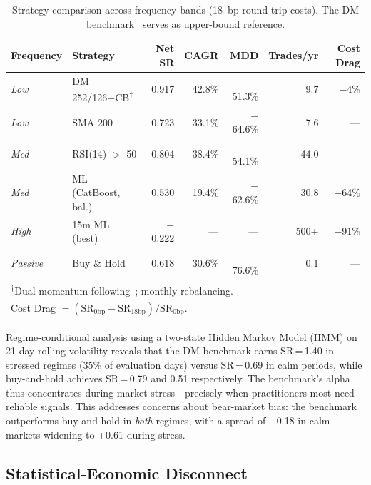 \documentclass[sigconf,anonymous,review]{acmart}
\begin{document}
\begin{table}[t]
\centering
\caption{Strategy comparison across frequency bands (18~bp round-trip
costs). The DM benchmark~\cite{antonacci2014dual} serves as
upper-bound reference.}
\label{tab:cost-baseline}
\small
\begin{tabular}{llrrrrr}
\toprule
Frequency & Strategy & Net SR & CAGR & MDD & Trades/yr & Cost Drag \\
\midrule
\textit{Low} & DM 252/126+CB\textsuperscript{$\dagger$} & 0.917 & 42.8\% & $-$51.3\% & 9.7 & $-$4\% \\
\textit{Low} & SMA 200 & 0.723 & 33.1\% & $-$64.6\% & 7.6 & --- \\
\textit{Med} & RSI(14) $>$ 50 & 0.804 & 38.4\% & $-$54.1\% & 44.0 & --- \\
\textit{Med} & ML (CatBoost, bal.) & 0.530 & 19.4\% & $-$62.6\% & 30.8 & $-$64\% \\
\textit{High} & 15m ML (best) & $-$0.222 & --- & --- & 500+ & $-$91\% \\
\textit{Passive} & Buy \& Hold & 0.618 & 30.6\% & $-$76.6\% & 0.1 & --- \\
\bottomrule
\multicolumn{7}{l}{\footnotesize \textsuperscript{$\dagger$}Dual
momentum following~\citet{antonacci2014dual}; monthly rebalancing.} \\
\multicolumn{7}{l}{\footnotesize Cost Drag $= (\text{SR}_{0\text{bp}} - \text{SR}_{18\text{bp}}) / \text{SR}_{0\text{bp}}$.}
\end{tabular}
\end{table}

Regime-conditional analysis using a two-state Hidden Markov Model (HMM) on 21-day rolling
volatility reveals that the DM benchmark earns SR\,=\,1.40 in stressed
regimes (35\% of evaluation days) versus SR\,=\,0.69 in calm periods,
while buy-and-hold achieves SR\,=\,0.79 and 0.51 respectively. The
benchmark's alpha thus concentrates during market stress---precisely
when practitioners most need reliable signals. This
addresses concerns about bear-market bias: the benchmark outperforms
buy-and-hold in \emph{both} regimes, with a spread of +0.18 in calm
markets widening to +0.61 during stress.


\subsection{Statistical-Economic Disconnect}
\label{sec:stat-econ}
\end{document}

